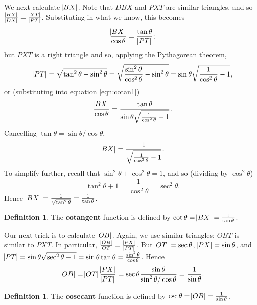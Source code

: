 \documentclass[a4paper,leqno]{article}
\numberwithin{equation}{section}
\theoremstyle{definition}
\newtheorem{defn}[equation]{Definition}
\theoremstyle{remark}
\newcommand{\df}[1]{\textbf{#1}}
\begin{document}
We next calculate $ \abs{BX} $. Note that $ DBX $ and $ PXT $ are similar triangles, and so $ \frac{\abs{BX}}{\abs{DX}} = \frac{\abs{XT}}{\abs{PT}} $.
Substituting in what we know, this becomes
\begin{equation}\label{eqn:cotan1}
  \frac{\abs{BX}}{\cos \theta} = \frac{\tan \theta}{\abs{PT}};
\end{equation}
but $ PXT $ is a right triangle and so, applying the Pythagorean theorem,
\begin{displaymath}
  \abs{PT} = \sqrt{\tan^2 \theta - \sin^2 \theta} = \sqrt{\frac{\sin^2 \theta}{\cos^2 \theta} - \sin^2 \theta} = \sin \theta \sqrt{\frac{1}{\cos^2 \theta} - 1},
\end{displaymath}
or (substituting into equation \ref{eqn:cotan1})
\begin{displaymath}
  \frac{\abs{BX}}{\cos \theta} = \frac{\tan\theta}{\sin\theta \sqrt{\frac{1}{\cos^2 \theta} - 1}}.
\end{displaymath}
Cancelling $ \tan \theta = \sin \theta/\cos \theta $,
\begin{displaymath}
  \abs{BX} = \frac{1}{\sqrt{\frac{1}{\cos^2 \theta} - 1}}.
\end{displaymath}
To simplify further, recall that $ \sin^2 \theta + \cos^2 \theta = 1 $, and so (dividing by $ \cos^2 \theta $)
\begin{equation}\label{eqn:tansecid}
  \tan^2 \theta + 1 = \frac{1}{\cos^2 \theta} = \sec^2 \theta.
\end{equation}
Hence $ \abs{BX} = \frac{1}{\sqrt{\tan^2 \theta}} = \frac{1}{\tan \theta} $.

\begin{defn}
  The \df{cotangent} function is defined by $ \cot \theta = \abs{BX} = \frac{1}{\tan \theta} $.
\end{defn}

Our next trick is to calculate $ \abs{OB} $. Again, we use similar triangles: $ OBT $ is similar to $ PXT $. In
particular, $ \frac{\abs{OB}}{\abs{OT}} = \frac{\abs{PX}}{\abs{PT}} $. But $ \abs{OT} = \sec \theta $, $ \abs{PX} = \sin \theta $,
and $ \abs{PT} = \sin \theta \sqrt{\sec^2 \theta - 1} = \sin \theta \tan \theta = \frac{\sin^2 \theta}{\cos \theta} $. Hence
\begin{displaymath}
  \abs{OB} = \abs{OT} \frac{\abs{PX}}{\abs{PT}} = \sec \theta \frac{\sin \theta}{\sin^2 \theta/\cos \theta} = \frac{1}{\sin \theta}.
\end{displaymath}

\begin{defn}
  The \df{cosecant} function is defined by $ \csc \theta = \abs{OB} = \frac{1}{\sin \theta} $.
\end{defn}
\end{document}

